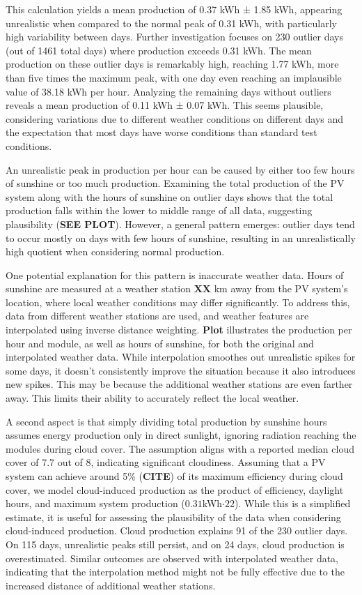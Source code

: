 \documentclass{article}
\begin{document}
This calculation yields a mean production of 0.37 kWh ± 1.85 kWh, appearing unrealistic when compared to the normal peak of 0.31 kWh, with particularly high variability between days. Further investigation focuses on 230 outlier days (out of 1461 total days) where production exceeds 0.31 kWh. The mean production on these outlier days is remarkably high, reaching 1.77 kWh, more than five times the maximum peak, with one day even reaching an implausible value of 38.18 kWh per hour. Analyzing the remaining days without outliers reveals a mean production of 0.11 kWh ± 0.07 kWh. This seems plausible, considering variations due to different weather conditions on different days and the expectation that most days have worse conditions than standard test conditions.

An unrealistic peak in production per hour can be caused by either too few hours of sunshine or too much production. Examining the total production of the PV system along with the hours of sunshine on outlier days shows that the total production falls within the lower to middle range of all data, suggesting plausibility (\textbf{SEE PLOT}). However, a general pattern emerges: outlier days tend to occur mostly on days with few hours of sunshine, resulting in an unrealistically high quotient when considering normal production.

One potential explanation for this pattern is inaccurate weather data. Hours of sunshine are measured at a weather station \textbf{XX} km away from the PV system's location, where local weather conditions may differ significantly. To address this, data from different weather stations are used, and weather features are interpolated using inverse distance weighting. \textbf{Plot } illustrates the production per hour and module, as well as hours of sunshine, for both the original and interpolated weather data. While interpolation smoothes out unrealistic spikes for some days, it doesn't consistently improve the situation because it also introduces new spikes. This may be because the additional weather stations are even farther away. This limits their ability to accurately reflect the local weather.

A second aspect is that simply dividing total production by sunshine hours assumes energy production only in direct sunlight, ignoring radiation reaching the modules during cloud cover. The assumption aligns with a reported median cloud cover of 7.7 out of 8, indicating significant cloudiness. Assuming that a PV system can achieve around 5\% (\textbf{CITE}) of its maximum efficiency during cloud cover, we model cloud-induced production as the product of efficiency, daylight hours, and maximum system production ($0.31 $kWh$ \cdot 22$). While this is a simplified estimate, it is useful for assessing the plausibility of the data when considering cloud-induced production. Cloud production explains 91 of the 230 outlier days. On 115 days, unrealistic peaks still persist, and on 24 days, cloud production is overestimated. Similar outcomes are observed with interpolated weather data, indicating that the interpolation method might not be fully effective due to the increased distance of additional weather stations. 
\end{document}
